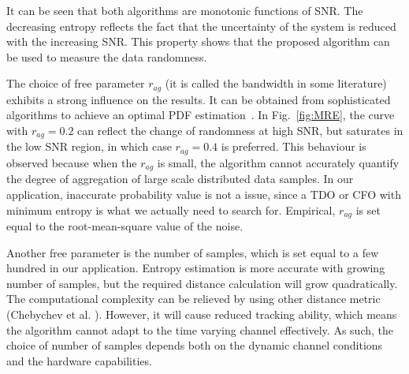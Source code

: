\documentclass[journal,comsoc, onecolumn, 12pt,draftclsnofoot]{IEEEtran} %
\begin{document}
It can be seen that both algorithms are monotonic functions of SNR.
The decreasing entropy reflects the fact that the uncertainty of the system is reduced with the increasing SNR.
This property shows that the proposed algorithm can be used to measure the data randomness.

The choice of free parameter \(r_{ag}\) (it is called the bandwidth in some literature) exhibits a strong influence on the results.
It can be obtained from sophisticated algorithms to achieve an optimal PDF estimation~\cite{Botev2010KernelDiffusion}.
In Fig.~\ref{fig:MRE}, the curve with \(r_{ag}=0.2\) can reflect the change of randomness at high SNR, but saturates in the low SNR region, in which case \(r_{ag}=0.4\) is preferred.
This behaviour is observed because when the \(r_{ag}\) is small, the algorithm cannot accurately quantify the degree of aggregation of large scale distributed data samples.
In our application, inaccurate probability value is not a issue, since a TDO or CFO with minimum entropy is what we actually need to search for.
Empirical, $r_{ag}$ is set equal to the root-mean-square value of the noise.

Another free parameter is the number of samples, which is set equal to a few hundred in our application.
Entropy estimation is more accurate with growing number of samples, but the required distance calculation will grow quadratically.
The computational complexity can be relieved by 
using other distance metric (Chebychev et al. \cite{Cha2007}).
However, it will cause reduced tracking ability, which means the algorithm cannot adapt to the time varying channel effectively.
As such, the choice of number of samples depends both on the dynamic channel conditions and the hardware capabilities.
% 
% 

\end{document}
